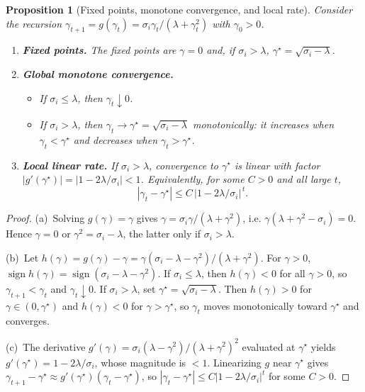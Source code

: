 \documentclass[11pt]{article}
\theoremstyle{spaced}
\newtheorem{proposition}{Proposition}
\begin{document}

\begin{proposition}[Fixed points, monotone convergence, and local rate]
\label{prop:als_rank1_fixedpoints}
Consider the recursion $\gamma_{t+1}=g(\gamma_t)=\sigma_i\gamma_t/(\lambda+\gamma_t^2)$ with $\gamma_0>0$.
\begin{enumerate}[label=(\alph*)]
\item \textbf{Fixed points.}
The fixed points are $\gamma=0$ and, if $\sigma_i>\lambda$, $\gamma^\star=\sqrt{\sigma_i-\lambda}$.

\item \textbf{Global monotone convergence.}
\begin{itemize}
    \item If $\sigma_i\le\lambda$, then $\gamma_t\downarrow 0$.
    \item If $\sigma_i>\lambda$, then $\gamma_t\to\gamma^\star=\sqrt{\sigma_i-\lambda}$ monotonically: it increases when $\gamma_t<\gamma^\star$ and decreases when $\gamma_t>\gamma^\star$.
\end{itemize}

\item \textbf{Local linear rate.}
If $\sigma_i>\lambda$, convergence to $\gamma^\star$ is linear with factor
$|g'(\gamma^\star)| = |1-2\lambda/\sigma_i| < 1$.
Equivalently, for some $C>0$ and all large $t$,
\[
|\gamma_t - \gamma^\star| \le C\,|1-2\lambda/\sigma_i|^{\,t}.
\]
\end{enumerate}
\end{proposition}

\begin{proof}
(a)~Solving $g(\gamma)=\gamma$ gives
$\gamma=\sigma_i\gamma/(\lambda+\gamma^2)$, i.e.
$\gamma(\lambda+\gamma^2-\sigma_i)=0$.
Hence $\gamma=0$ or $\gamma^2=\sigma_i-\lambda$, the latter only if $\sigma_i>\lambda$.

(b)~Let $h(\gamma)=g(\gamma)-\gamma
   = \gamma(\sigma_i-\lambda-\gamma^2)/(\lambda+\gamma^2)$.
For $\gamma>0$, $\operatorname{sign}h(\gamma)=\operatorname{sign}(\sigma_i-\lambda-\gamma^2)$.
If $\sigma_i\le\lambda$, then $h(\gamma)<0$ for all $\gamma>0$,
so $\gamma_{t+1}<\gamma_t$ and $\gamma_t\downarrow 0$.
If $\sigma_i>\lambda$, set $\gamma^\star=\sqrt{\sigma_i-\lambda}$.
Then $h(\gamma)>0$ for $\gamma\in(0,\gamma^\star)$
and $h(\gamma)<0$ for $\gamma>\gamma^\star$,
so $\gamma_t$ moves monotonically toward $\gamma^\star$ and converges.

(c)~The derivative
$g'(\gamma)=\sigma_i(\lambda-\gamma^2)/(\lambda+\gamma^2)^2$
evaluated at $\gamma^\star$ yields
$g'(\gamma^\star)=1-2\lambda/\sigma_i$, whose magnitude is $<1$.
Linearizing $g$ near $\gamma^\star$ gives
$\gamma_{t+1}-\gamma^\star\approx g'(\gamma^\star)(\gamma_t-\gamma^\star)$,
so $|\gamma_t-\gamma^\star|\le C|1-2\lambda/\sigma_i|^{t}$ for some $C>0$.
\end{proof}
\end{document}
